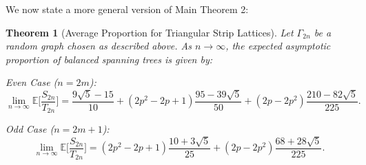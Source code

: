 \documentclass{amsart}
\newtheorem{theorem}{Theorem}[section]
\theoremstyle{definition}
\begin{document}
\par

We now state a more general version of Main Theorem 2:

\begin{theorem}[Average Proportion for Triangular Strip Lattices]
\label{thm:generalized_expected_proportion}
Let $\Gamma_{2n}$ be a random graph chosen as described above. As $n \to \infty$, the expected asymptotic proportion of balanced spanning trees is given by:

Even Case ($n = 2m$):
\[
    \lim_{n \to \infty}\mathbb{E}\bigg[\frac{S_{2n}}{T_{2n}}\bigg] = \frac{9\sqrt{5} - 15}{10} + (2p^2 - 2p + 1)\frac{95 - 39\sqrt{5}}{50} + (2p - 2p^2)\frac{210 - 82\sqrt{5}}{225}.\]

Odd Case ($n = 2m + 1$):
\[
    \lim_{n \to \infty}\mathbb{E}\bigg[\frac{S_{2n}}{T_{2n}}\bigg] = (2p^2 - 2p + 1)\frac{10 + 3\sqrt{5}}{25} + (2p - 2p^2)\frac{68 + 28\sqrt{5}}{225}.
\]
\end{theorem}
\end{document}
